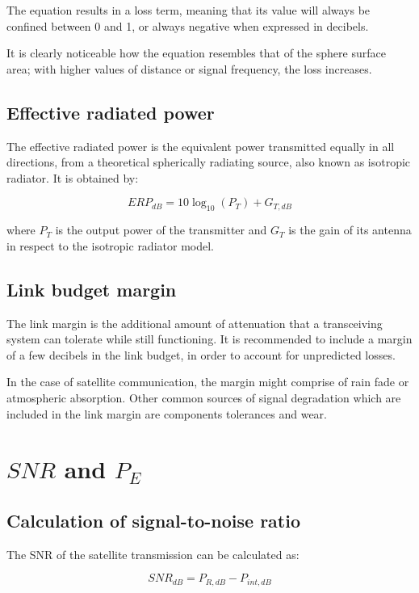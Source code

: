 The equation results in a loss term, meaning that its value will always be confined between 0 and 1, or always negative when expressed in decibels.

It is clearly noticeable how the equation resembles that of the sphere surface area; with higher values of distance or signal frequency, the loss increases.



\subsection{Effective radiated power}
The effective radiated power is the equivalent power transmitted equally in all directions, from a theoretical spherically radiating source, also known as isotropic radiator.
It is obtained by:

\begin{equation}
	{ERP}_{dB} = 10\log_{10}(P_T) + G_{T, dB}
\end{equation}

where $P_T$ is the output power of the transmitter and $G_T$ is the gain of its antenna in respect to the isotropic radiator model.


\subsection{Link budget margin}
The link margin is the additional amount of attenuation that a transceiving system can tolerate while still functioning.
It is recommended to include a margin of a few decibels in the link budget, in order to account for unpredicted losses.

In the case of satellite communication, the margin might comprise of rain fade or atmospheric absorption.
Other common sources of signal degradation which are included in the link margin are components tolerances and wear.


\section{$SNR$ and $P_E$}

\subsection{Calculation of signal-to-noise ratio}
The SNR of the satellite transmission can be calculated as:

\begin{equation}
	{SNR}_{dB} = P_{R, dB} - P_{int, dB}
\end{equation}

